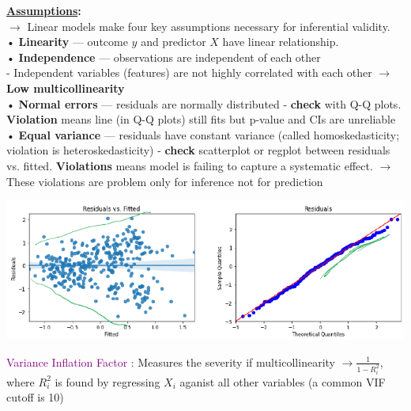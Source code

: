 \documentclass[letterpaper, 10.5pt,landscape]{article}
\begin{document}
\begin{multicols*}{3}
\textbf{\underline{Assumptions}:} \\
$\rightarrow$  Linear models make four key assumptions necessary for inferential
validity. \\
• \textbf{Linearity} — outcome $y$ and predictor $X$ have linear relationship. \\
• \textbf{Independence} — observations are independent of each other\\
- Independent variables (features) are not highly correlated with each other $\rightarrow$ \textbf{Low multicollinearity} \\
• \textbf{Normal errors} — residuals are normally distributed - \textbf{check} with Q-Q plots.\textbf{ Violation} means line (in Q-Q plots) still fits but p-value and CIs are unreliable\\
• \textbf{Equal variance} — residuals have constant variance (called
homoskedasticity; violation is heteroskedasticity) - \textbf{check} scatterplot or regplot between residuals vs. fitted. \textbf{Violations} means model is failing to capture a systematic effect. $\rightarrow$  These violations are problem only for inference not for prediction



\begin{minipage}{\linewidth}
    \centering
    \includegraphics[width=\textwidth]{figures/Violation_EqualVariance_and_NormalErros.PNG}
\end{minipage}





\vspace{3pt}
\textcolor{purple}{Variance Inflation Factor :} Measures the severity if multicollinearity $\rightarrow \boxed{\frac{1}{1-R_{i}^{2}}}$, where $R_{i}^{2}$ is found by regressing $X_{i}$ aganist all other variables (a common VIF cutoff is 10)



\end{multicols*}
\end{document}
